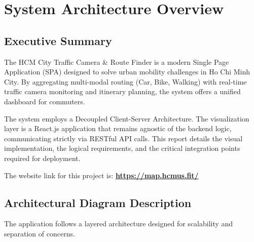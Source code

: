 \chapter{System Architecture Overview}
\label{chap:overview}

\section{Executive Summary}

The HCM City Traffic Camera \& Route Finder is a modern Single Page Application (SPA) designed to solve urban mobility challenges in Ho Chi Minh City. By aggregating multi-modal routing (Car, Bike, Walking) with real-time traffic camera monitoring and itinerary planning, the system offers a unified dashboard for commuters.

The system employs a Decoupled Client-Server Architecture. The visualization layer is a React.js application that remains agnostic of the backend logic, communicating strictly via RESTful API calls. This report details the visual implementation, the logical requirements, and the critical integration points required for deployment.

The website link for this project is: \Large\textbf{\url{https://map.hcmus.fit/}}

\section{Architectural Diagram Description}
The application follows a layered architecture designed for scalability and separation of concerns.


